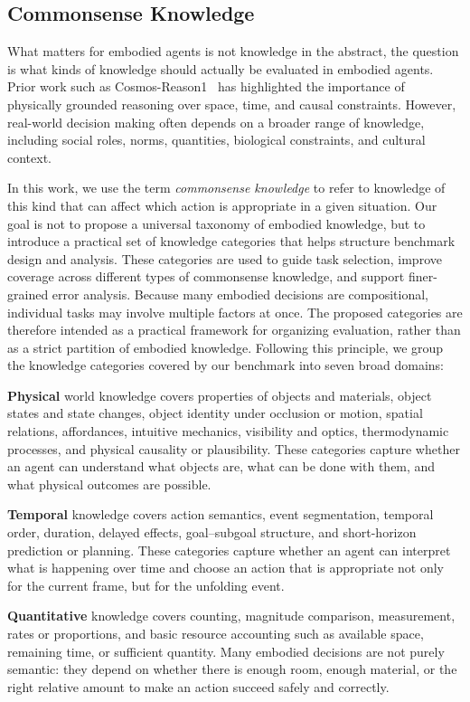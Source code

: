 \documentclass[11pt]{article}
\begin{document}
\subsection{Commonsense Knowledge}

What matters for embodied agents is not knowledge in the abstract, the question is what kinds of knowledge should actually be evaluated in embodied agents. Prior work such as Cosmos-Reason1~\citep{azzolini2025cosmos} has highlighted the importance of physically grounded reasoning over space, time, and causal constraints. However, real-world decision making often depends on a broader range of knowledge, including social roles, norms, quantities, biological constraints, and cultural context. 

In this work, we use the term \emph{commonsense knowledge} to refer to knowledge of this kind that can affect which action is appropriate in a given situation. Our goal is not to propose a universal taxonomy of embodied knowledge, but to introduce a practical set of knowledge categories that helps structure benchmark design and analysis. These categories are used to guide task selection, improve coverage across different types of commonsense knowledge, and support finer-grained error analysis. Because many embodied decisions are compositional, individual tasks may involve multiple factors at once. The proposed categories are therefore intended as a practical framework for organizing evaluation, rather than as a strict partition of embodied knowledge. Following this principle, we group the knowledge categories covered by our benchmark into seven broad domains:

\textbf{Physical} world knowledge covers properties of objects and materials, object states and state changes, object identity under occlusion or motion, spatial relations, affordances, intuitive mechanics, visibility and optics, thermodynamic processes, and physical causality or plausibility. These categories capture whether an agent can understand what objects are, what can be done with them, and what physical outcomes are possible. 
 
\textbf{Temporal} knowledge covers action semantics, event segmentation, temporal order, duration, delayed effects, goal–subgoal structure, and short-horizon prediction or planning. These categories capture whether an agent can interpret what is happening over time and choose an action that is appropriate not only for the current frame, but for the unfolding event. 

\textbf{Quantitative} knowledge covers counting, magnitude comparison, measurement, rates or proportions, and basic resource accounting such as available space, remaining time, or sufficient quantity. Many embodied decisions are not purely semantic: they depend on whether there is enough room, enough material, or the right relative amount to make an action succeed safely and correctly.
\end{document}
